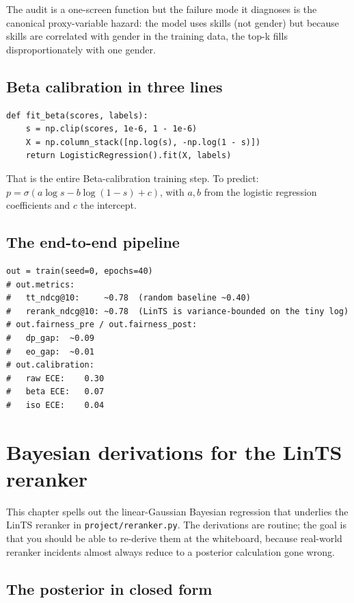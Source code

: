 \documentclass[11pt,oneside]{scrbook}
\begin{document}
The audit is a one-screen function but the failure mode it diagnoses is the
canonical proxy-variable hazard: the model uses skills (not gender) but
because skills are correlated with gender in the training data, the top-k
fills disproportionately with one gender.

\section{Beta calibration in three lines}

\begin{verbatim}
def fit_beta(scores, labels):
    s = np.clip(scores, 1e-6, 1 - 1e-6)
    X = np.column_stack([np.log(s), -np.log(1 - s)])
    return LogisticRegression().fit(X, labels)
\end{verbatim}

That is the entire Beta-calibration training step. To predict:
$p = \sigma(a \log s - b \log(1 - s) + c)$, with $a, b$ from the logistic
regression coefficients and $c$ the intercept.

\section{The end-to-end pipeline}

\begin{verbatim}
out = train(seed=0, epochs=40)
# out.metrics:
#   tt_ndcg@10:     ~0.78  (random baseline ~0.40)
#   rerank_ndcg@10: ~0.78  (LinTS is variance-bounded on the tiny log)
# out.fairness_pre / out.fairness_post:
#   dp_gap:  ~0.09
#   eo_gap:  ~0.01
# out.calibration:
#   raw ECE:    0.30
#   beta ECE:   0.07
#   iso ECE:    0.04
\end{verbatim}

\chapter{Bayesian derivations for the LinTS reranker}

This chapter spells out the linear-Gaussian Bayesian regression that
underlies the LinTS reranker in \texttt{project/reranker.py}. The
derivations are routine; the goal is that you should be able to re-derive
them at the whiteboard, because real-world reranker incidents almost always
reduce to a posterior calculation gone wrong.

\section{The posterior in closed form}
\end{document}
